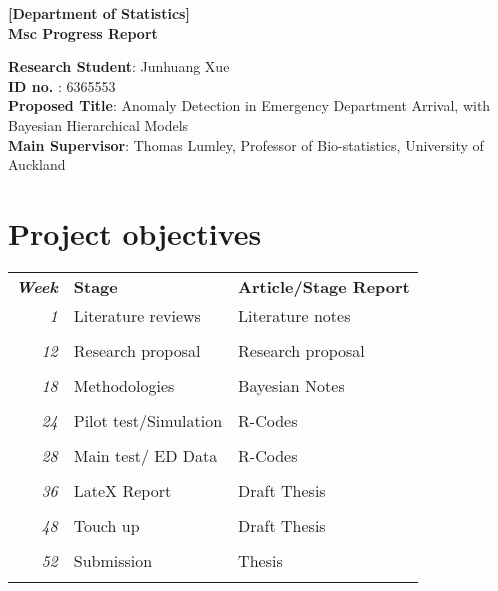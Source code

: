 \documentclass[12pt, twoside]{article}
\begin{document}
  
	
\begin{center}
\bf{[Department of Statistics]}\\
\bf{Msc Progress Report}
\end{center}

\textbf{Research Student}: Junhuang Xue \\

\textbf{ID no. }: 6365553\\

\textbf{Proposed Title}: Anomaly Detection in Emergency Department Arrival, with Bayesian Hierarchical Models\\

\textbf{Main Supervisor}: Thomas Lumley, Professor of Bio-statistics, University of Auckland


\section*{Project objectives}

\begin{tabular}{r|p{5cm}p{7cm}}
	
	\emph{\textbf{Week}}& \textbf{Stage} & \textbf{Article/Stage Report}\\
	
	\emph{1} & Literature reviews & Literature notes \\
	&&\\
	\emph{12} & Research proposal & Research proposal \\
	&&\\
	\emph{18} & Methodologies & Bayesian Notes \\
	&&\\
	\emph{24} & Pilot test/Simulation & R-Codes\\
	&&\\
	\emph{28} & Main test/ ED Data & R-Codes\\
	&&\\
	\emph{36} & LateX Report & Draft Thesis\\
	&&\\
	\emph{48} & Touch up & Draft Thesis\\
	&&\\
	\emph{52} & Submission & Thesis\\
	&&\\
	
\end{tabular}
\end{document}
